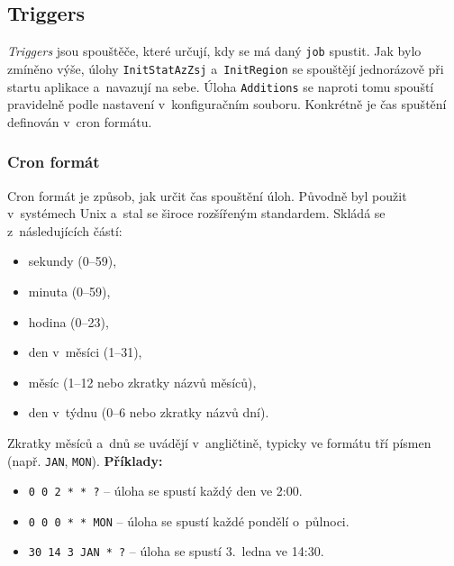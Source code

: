 \subsection{Triggers}
\textit{Triggers} jsou spouštěče, které určují, kdy se má daný \texttt{job} spustit.  
Jak bylo zmíněno výše, úlohy \texttt{InitStatAzZsj} a~\texttt{InitRegion} se spouštějí jednorázově při startu aplikace a~navazují na sebe.  
Úloha \texttt{Additions} se naproti tomu spouští pravidelně podle nastavení v~konfiguračním souboru.  
Konkrétně je čas spuštění definován v~cron formátu.

\subsubsection*{Cron formát}
Cron formát je způsob, jak určit čas spouštění úloh.  
Původně byl použit v~systémech Unix a~stal se široce rozšířeným standardem.  
Skládá se z~následujících částí:
\begin{itemize}
    \item sekundy (0--59),
    \item minuta (0--59),
    \item hodina (0--23),
    \item den v~měsíci (1--31),
    \item měsíc (1--12 nebo zkratky názvů měsíců),
    \item den v~týdnu (0--6 nebo zkratky názvů dní).
\end{itemize}
Zkratky měsíců a~dnů se uvádějí v~angličtině, typicky ve formátu tří písmen (např. \texttt{JAN}, \texttt{MON}).
\textbf{Příklady:}
\begin{itemize}
    \item \texttt{0 0 2 * * ?} -- úloha se spustí každý den ve 2:00.
    \item \texttt{0 0 0 * * MON} -- úloha se spustí každé pondělí o~půlnoci.
    \item \texttt{30 14 3 JAN * ?} -- úloha se spustí 3.~ledna ve 14:30.
\end{itemize}

\newpage

